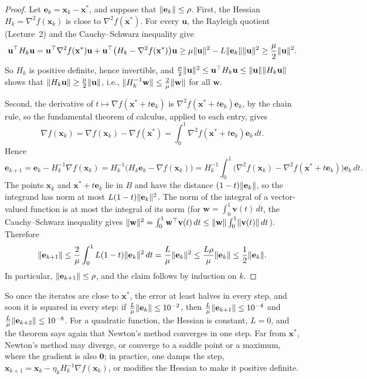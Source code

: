 \begin{proof}
    Let $\mathbf{e}_k = \mathbf{x}_k - \mathbf{x}^*$, and suppose that $\lVert \mathbf{e}_k \rVert \leq \rho$. First, the Hessian $H_k = \nabla^2 f(\mathbf{x}_k)$ is close to $\nabla^2 f(\mathbf{x}^*)$. For every $\mathbf{u}$, the Rayleigh quotient (Lecture~2) and the Cauchy--Schwarz inequality give
    \[\mathbf{u}^\top H_k\mathbf{u} = \mathbf{u}^\top\nabla^2 f(\mathbf{x}^*)\mathbf{u} + \mathbf{u}^\top\big(H_k - \nabla^2 f(\mathbf{x}^*)\big)\mathbf{u} \geq \mu\lVert \mathbf{u} \rVert^2 - L\lVert \mathbf{e}_k \rVert\lVert \mathbf{u} \rVert^2 \geq \frac{\mu}{2}\lVert \mathbf{u} \rVert^2.\]
    So $H_k$ is positive definite, hence invertible, and $\frac{\mu}{2}\lVert \mathbf{u} \rVert^2 \leq \mathbf{u}^\top H_k\mathbf{u} \leq \lVert \mathbf{u} \rVert\lVert H_k\mathbf{u} \rVert$ shows that $\lVert H_k\mathbf{u} \rVert \geq \frac{\mu}{2}\lVert \mathbf{u} \rVert$, i.e., $\lVert H_k^{-1}\mathbf{w} \rVert \leq \frac{2}{\mu}\lVert \mathbf{w} \rVert$ for all $\mathbf{w}$.

    Second, the derivative of $t \mapsto \nabla f(\mathbf{x}^* + t\mathbf{e}_k)$ is $\nabla^2 f(\mathbf{x}^* + t\mathbf{e}_k)\mathbf{e}_k$, by the chain rule, so the fundamental theorem of calculus, applied to each entry, gives
    \[\nabla f(\mathbf{x}_k) = \nabla f(\mathbf{x}_k) - \nabla f(\mathbf{x}^*) = \int_0^1 \nabla^2 f(\mathbf{x}^* + t\mathbf{e}_k)\mathbf{e}_k\, dt.\]
    Hence
    \[\mathbf{e}_{k+1} = \mathbf{e}_k - H_k^{-1}\nabla f(\mathbf{x}_k) = H_k^{-1}\big(H_k\mathbf{e}_k - \nabla f(\mathbf{x}_k)\big) = H_k^{-1}\int_0^1 \big(\nabla^2 f(\mathbf{x}_k) - \nabla^2 f(\mathbf{x}^* + t\mathbf{e}_k)\big)\mathbf{e}_k\, dt.\]
    The points $\mathbf{x}_k$ and $\mathbf{x}^* + t\mathbf{e}_k$ lie in $B$ and have the distance $(1 - t)\lVert \mathbf{e}_k \rVert$, so the integrand has norm at most $L(1 - t)\lVert \mathbf{e}_k \rVert^2$. The norm of the integral of a vector-valued function is at most the integral of its norm (for $\mathbf{w} = \int_0^1 \mathbf{v}(t)\, dt$, the Cauchy--Schwarz inequality gives $\lVert \mathbf{w} \rVert^2 = \int_0^1 \mathbf{w}^\top\mathbf{v}(t)\, dt \leq \lVert \mathbf{w} \rVert\int_0^1 \lVert \mathbf{v}(t) \rVert\, dt$). Therefore
    \[\lVert \mathbf{e}_{k+1} \rVert \leq \frac{2}{\mu}\int_0^1 L(1 - t)\lVert \mathbf{e}_k \rVert^2\, dt = \frac{L}{\mu}\lVert \mathbf{e}_k \rVert^2 \leq \frac{L\rho}{\mu}\lVert \mathbf{e}_k \rVert \leq \frac{1}{2}\lVert \mathbf{e}_k \rVert.\]
    In particular, $\lVert \mathbf{e}_{k+1} \rVert \leq \rho$, and the claim follows by induction on $k$.
\end{proof}

So once the iterates are close to $\mathbf{x}^*$, the error at least halves in every step, and soon it is squared in every step: if $\frac{L}{\mu}\lVert \mathbf{e}_k \rVert \leq 10^{-2}$, then $\frac{L}{\mu}\lVert \mathbf{e}_{k+1} \rVert \leq 10^{-4}$ and $\frac{L}{\mu}\lVert \mathbf{e}_{k+2} \rVert \leq 10^{-8}$. For a quadratic function, the Hessian is constant, $L = 0$, and the theorem says again that Newton's method converges in one step. Far from $\mathbf{x}^*$, Newton's method may diverge, or converge to a saddle point or a maximum, where the gradient is also $\mathbf{0}$; in practice, one damps the step, $\mathbf{x}_{k+1} = \mathbf{x}_k - \eta_k H_k^{-1}\nabla f(\mathbf{x}_k)$, or modifies the Hessian to make it positive definite.

